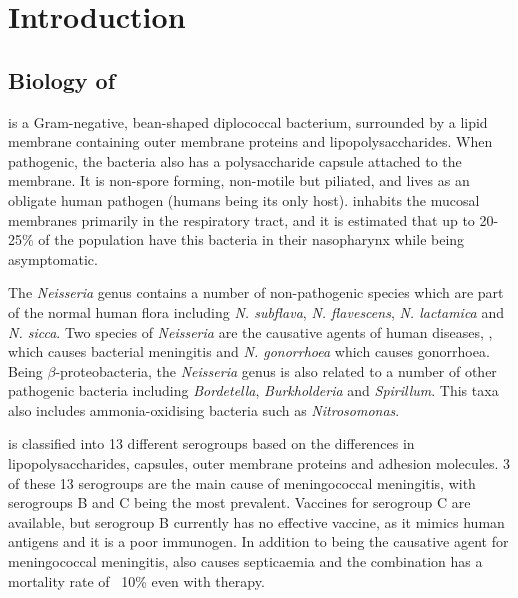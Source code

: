 \chapter{Introduction}
\label{chap:intro}

\section{Biology of \Nsm{}}
\Nsm{} is a Gram-negative, bean-shaped diplococcal bacterium\cite{Deuren2000}, surrounded by a lipid membrane containing outer membrane proteins and lipopolysaccharides\cite{Deuren2000}. When pathogenic, the bacteria also has a polysaccharide capsule attached to the membrane\cite{Deuren2000}. It is non-spore forming, non-motile but piliated, and lives as an obligate human pathogen (humans being its only host)\cite{Stephens2009}. \Nm{} inhabits the mucosal membranes primarily in the respiratory tract, and it is estimated that up to 20-25\% of the population have this bacteria in their nasopharynx while being asymptomatic\cite{Rosenstein2001,Stephens2009,DeVoe1982}.

The \textit{Neisseria} genus contains a number of non-pathogenic species which are part of the normal human flora including \textit{N. subflava},  \textit{N. flavescens},  \textit{N. lactamica} and \textit{N. sicca}\cite{Aas2005}. Two species of \textit{Neisseria} are the causative agents of human diseases, \Nm{}, which causes bacterial meningitis and \textit{N. gonorrhoea} which causes gonorrhoea. Being $\beta$-proteobacteria\cite{Stephens2009}, the \textit{Neisseria} genus is also related to a number of other pathogenic bacteria including \textit{Bordetella}, \textit{Burkholderia} and \textit{Spirillum}. This taxa also includes ammonia-oxidising bacteria such as \textit{Nitrosomonas}\cite{Madigan2005}.

\Nm{} is classified into 13 different serogroups based on the differences in lipopolysaccharides, capsules, outer membrane proteins and adhesion molecules\cite{Stephens2009,Deuren2000,Carbonnelle2009}. 3 of these 13 serogroups are the main cause of meningococcal meningitis, with serogroups B and C being the most prevalent\cite{Deuren2000}. Vaccines for serogroup C are available, but serogroup B currently has no effective vaccine, as it mimics human antigens\cite{Stephens2009} and it is a poor immunogen\cite{Stephens2007}. In addition to being the causative agent for meningococcal meningitis, \Nm{} also causes septicaemia and the combination has a mortality rate of ~10\% even with therapy\cite{Deuren2000,Stephens2009}.

